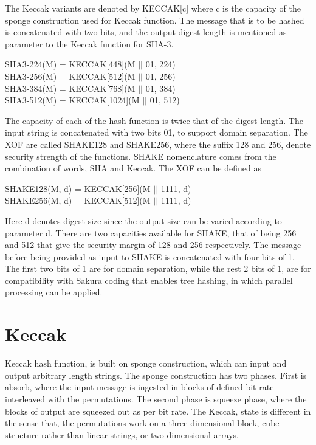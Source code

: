 The Keccak variants are denoted by KECCAK[c] where c is the capacity of the sponge construction used for Keccak
function. The message that is to be hashed is concatenated with two bits, and the output digest length is mentioned
as parameter to the Keccak function for SHA-3.
\begin{center}
SHA3-224(M) = KECCAK[448](M $\vert \vert$ 01, 224) \\
SHA3-256(M) = KECCAK[512](M $\vert \vert$ 01, 256) \\
SHA3-384(M) = KECCAK[768](M $\vert \vert$ 01, 384) \\
SHA3-512(M) = KECCAK[1024](M $\vert \vert$ 01, 512)
\end{center}
The capacity of each of the hash function is twice that of the digest length. The input string is concatenated with two
bits 01, to support domain separation. The XOF are called SHAKE128 and SHAKE256, where the suffix 128 and 256, denote
security strength of the functions. SHAKE nomenclature comes from the combination of words, SHA and Keccak. The XOF
can be defined as 
\begin{center}
SHAKE128(M, d) = KECCAK[256](M $\vert \vert$ 1111, d) \\
SHAKE256(M, d) = KECCAK[512](M $\vert \vert$ 1111, d)
\end{center}
Here d denotes digest size since the output size can be varied according to parameter d. There are two capacities available
for SHAKE, that of being 256 and 512 that give the security margin of 128 and 256 respectively. The message before
being provided as input to SHAKE is concatenated  with four bits of 1. The first two bits of 1 are for domain separation,
while the rest 2 bits of 1, are for compatibility with Sakura coding that enables tree hashing, in which parallel
processing can be applied.

\section{Keccak}
Keccak hash function, is built on sponge construction, which can input and output arbitrary length strings. The sponge
construction has two phases. First is absorb, where the input message is ingested in blocks of defined bit rate interleaved
with the permutations. The second phase is squeeze phase, where the blocks of output are squeezed out as per bit rate. 
The Keccak, state is different in the sense that, the permutations work on a three dimensional block, cube
structure rather than linear strings, or two dimensional arrays.

